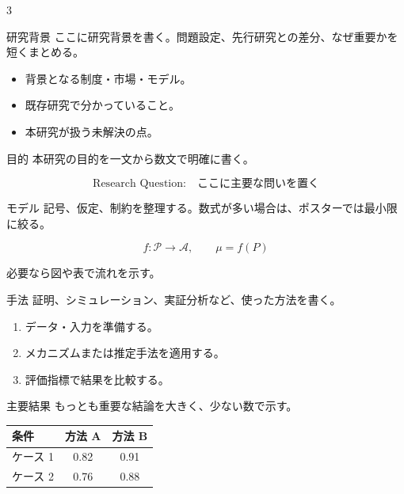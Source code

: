 \documentclass[12pt,dvipdfmx]{jsarticle}
\begin{document}
\begin{multicols}{3}

\begin{posterblock}{研究背景}
ここに研究背景を書く。問題設定、先行研究との差分、なぜ重要かを短くまとめる。

\vspace{4mm}
\begin{itemize}
  \item 背景となる制度・市場・モデル。
  \item 既存研究で分かっていること。
  \item 本研究が扱う未解決の点。
\end{itemize}
\end{posterblock}

\begin{posterblock}{目的}
本研究の目的を一文から数文で明確に書く。

\[
  \text{Research Question:}\quad
  \text{ここに主要な問いを置く}
\]
\end{posterblock}

\begin{posterblock}{モデル}
記号、仮定、制約を整理する。数式が多い場合は、ポスターでは最小限に絞る。

\[
  f : \mathcal{P} \to \mathcal{A}, \qquad
  \mu = f(P)
\]

必要なら図や表で流れを示す。
\end{posterblock}

\begin{posterblock}{手法}
証明、シミュレーション、実証分析など、使った方法を書く。

\begin{enumerate}
  \item データ・入力を準備する。
  \item メカニズムまたは推定手法を適用する。
  \item 評価指標で結果を比較する。
\end{enumerate}
\end{posterblock}

\begin{posterblock}{主要結果}
もっとも重要な結論を大きく、少ない数で示す。

\begin{center}
\begin{tabular}{lcc}
\toprule
条件 & 方法 A & 方法 B \\
\midrule
ケース 1 & 0.82 & 0.91 \\
ケース 2 & 0.76 & 0.88 \\
\bottomrule
\end{tabular}
\end{center}


\end{posterblock}
\end{multicols}
\end{document}
